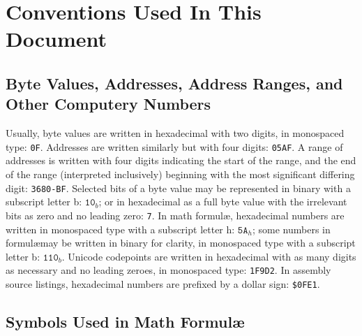 \documentclass[12pt]{{memoir}}
\begin{document}
\cleartorecto
\tableofcontents*
\clearpage
\pagestyle{headings}

\vspace*{3in}
\section*{Conventions Used In This Document}
\subsection{Byte Values, Addresses, Address Ranges, and Other Computery Numbers}

Usually, byte values are written in hexadecimal with two digits, in monospaced type: \texttt{0F}. Addresses are written similarly but with four digits: \texttt{05AF}. A range of addresses is written with four digits indicating the start of the range, and the end of the range (interpreted inclusively) beginning with the most significant differing digit: \texttt{3680-BF}. Selected bits of a byte value may be represented in binary with a subscript letter b: $\texttt{10}_b$; or in hexadecimal as a full byte value with the irrelevant bits as zero and no leading zero: \texttt{7}. In math formul\ae, hexadecimal numbers are written in monospaced type with a subscript letter h: $\texttt{5A}_h$; some numbers in formul\ae may be written in binary for clarity, in monospaced type with a subscript letter b: $\texttt{110}_b$. Unicode codepoints are written in hexadecimal with as many digits as necessary and no leading zeroes, in monospaced type: \texttt{1F9D2}. In assembly source listings, hexadecimal numbers are prefixed by a dollar sign: \texttt{\$0FE1}.

\subsection{Symbols Used in Math Formul\ae}
\end{document}
